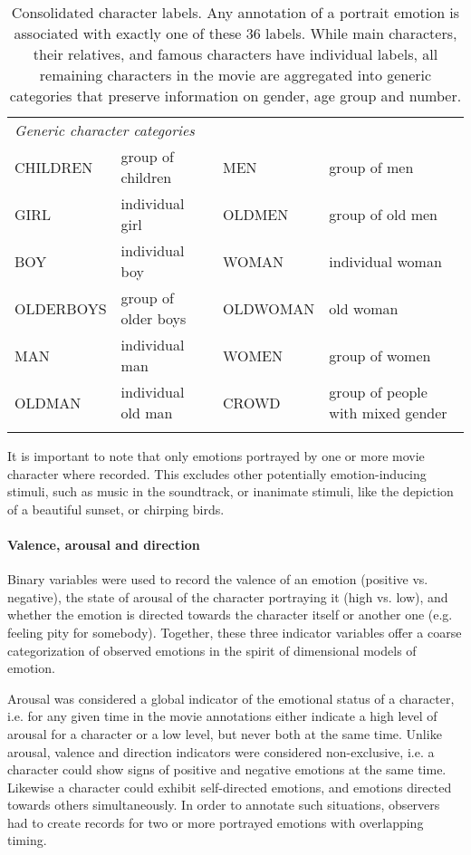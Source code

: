 \begin{table*}
\begin{tabular}{p{4cm}p{4cm}p{3.6cm}p{4cm}}
\multicolumn{4}{l}{\textit{Generic character categories}} \\
CHILDREN  & group of children & MEN      & group of men \\
GIRL      & individual girl & OLDMEN   & group of old men \\
BOY       & individual boy & WOMAN    & individual woman \\
OLDERBOYS & group of older boys & OLDWOMAN & old woman\\
MAN       & individual man & WOMEN    & group of women \\
OLDMAN    & individual old man & CROWD    & group of people with mixed gender \\
 \\\hline
  \end{tabular}
  \caption{Consolidated character labels. Any annotation of a portrait emotion
  is associated with exactly one of these 36 labels. While main characters,
  their relatives, and famous characters have individual labels, all remaining
  characters in the movie are aggregated into generic categories that preserve
  information on gender, age group and number.}
  \label{tab:characters}
\end{table*}

It is important to note that only emotions portrayed by one or more movie
character where recorded. This excludes other potentially emotion-inducing
stimuli, such as music in the soundtrack, or inanimate stimuli, like the
depiction of a beautiful sunset, or chirping birds.

\paragraph{Valence, arousal and direction}

Binary variables were used to record the valence of an emotion (positive vs.
negative), the state of arousal of the character portraying it (high vs. low),
and whether the emotion is directed towards the character itself or another one
(e.g. feeling pity for somebody). Together, these three indicator variables offer a
coarse categorization of observed emotions in the spirit of dimensional models
of emotion.

Arousal was considered a global indicator of the emotional status of a
character, i.e. for any given time in the movie annotations either indicate a
high level of arousal for a character or a low level, but never both at the
same time. Unlike arousal, valence and direction indicators were considered
non-exclusive, i.e. a character could show signs of positive and negative
emotions at the same time. Likewise a character could exhibit self-directed
emotions, and emotions directed towards others simultaneously. In order to
annotate such situations, observers had to create records for two or more
portrayed emotions with overlapping timing.

